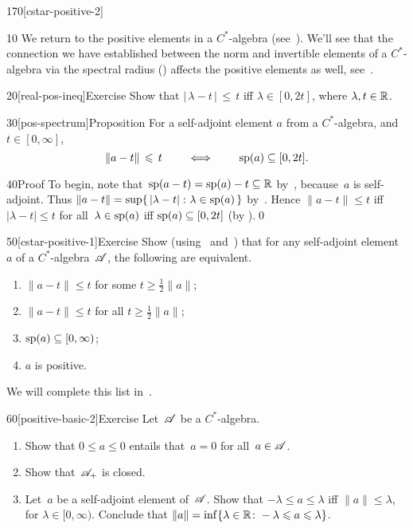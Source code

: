 \begin{parsec}{170}[cstar-positive-2]%
\begin{point}{10}%
We return to the positive elements 
in a $C^*$-algebra (see~).
We'll see that the connection we have established
between the norm and invertible elements
of a $C^*$-algebra
via the spectral radius ()
affects the positive elements as well, see~.
\end{point}
\begin{point}{20}[real-pos-ineq]{Exercise}%
Show that 
$\left|\,\lambda-t\,\right| \,\leq\, t$ iff  $\lambda \in[0,2t]$,
where $\lambda,t\in\mathbb{R}$.
\end{point}
\begin{point}{30}[pos-spectrum]{Proposition}%
For a self-adjoint element $a$ from a $C^*$-algebra,
and $t\in [0,\infty]$, 
\begin{equation*}
\|a-t\|\,\leqslant\, t\qquad\iff\qquad \mathrm{sp}(a)\subseteq [0,2t].
\end{equation*}%
\begin{point}{40}{Proof}%
To begin, note that~$\mathrm{sp}(a-t)=\mathrm{sp}(a)-t\subseteq \mathbb{R}$ 
by~,
because~$a$ is self-adjoint.
Thus $\|a-t\|=\sup\{\,\left|\lambda-t\right|\colon \lambda\in \mathrm{sp}(a)\,\}$
by~.
Hence $\|a-t\|\leq t$
iff $\left|\lambda-t\right|\leq t$ for all~$\lambda\in\mathrm{sp}(a)$
iff $\mathrm{sp}(a)\subseteq [0,2t]$ (by ).\qed
\end{point}
\end{point}
\begin{point}{50}[cstar-positive-1]{Exercise}%
%
Show
(using~ and~)
that
for any self-adjoint element $a$ of a $C^*$-algebra~$\mathscr{A}$,
the following are equivalent.
\begin{enumerate}
\item 
\label{cstar-pos-1}
$\|a-t\|\leq t$
for some $t\geq \frac{1}{2}\|a\|$;
\item 
\label{cstar-pos-2}
$\|a-t\|\leq t$
for all $t\geq \frac{1}{2}\|a\|$;
\item 
\label{cstar-pos-3}
$\mathrm{sp}(a)\subseteq[0,\infty)$;
\item
$a$ is positive.
\end{enumerate}
We will complete this list in~.
\end{point}
\begin{point}{60}[positive-basic-2]{Exercise}%
Let~$\mathscr{A}$ be a $C^*$-algebra.
\begin{enumerate}
\item
Show that $0\leq a\leq 0$ entails that~$a=0$
for all~$a\in\mathscr{A}$.
\item
Show that~$\mathscr{A}_{+}$ is closed.
\item
Let~$a$ be a self-adjoint element of~$\mathscr{A}$.
Show that
 $-\lambda \leq a\leq \lambda$
iff $\|a\|\leq \lambda$,
for $\lambda\in [0,\infty)$.
Conclude that $\|a\| = \inf\{ \lambda \in \mathbb{R}\colon 
-\lambda \leqslant a\leqslant \lambda\}$.


\end{enumerate}
\end{point}
\end{parsec}
